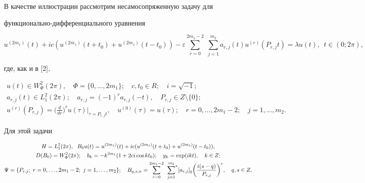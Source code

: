  


В качестве иллюстрации рассмотрим несамосопряженную задачу для 


функционально-диф\-фе\-ренциального уравнения 


\begin{equation} 


u^{(2m_1)}(t){+}i c(u^{(2m_1)}(t{+}t_0){+}u^{(2m_1)}(t{-}t_0))- 


\varepsilon\sum^{2m_1-2}_{r=0}\;\sum^{m_2}_{j=1}a_{r,j} 


(t)u^{(r)}(P_{r,j}t){=}\lambda u(t),\ \; t\in(0;2\pi), 


\end{equation} 


где, как и в [2], 


\begin{gather*} 


u(t)\in W^2_\Phi(2\pi),\quad \Phi=\{0,\dotsc,2m_1\};\quad 


c,t_0\in R;\quad i=\sqrt{-1}; \\ 


% 


a_{r,j}(t)\in L^2_1(2\pi);\quad 


a_{r,j}=(-1)^r a_{r,j}(-t),\quad P_{r,j}\in Z\setminus\{0\};\\ 


% 


u^{(r)}(P_{r,j})=\bigg(\frac{d}{dr}\bigg)^r u(\tau) 


\bigg|_{\tau=P_{r,j}t},\quad u^{(0)}(\tau)=u(\tau);\quad 


r=0,\dotsc,2m_1-2;\quad j=1,\dotsc,m_2. 


\end{gather*} 


Для этой задачи 


\begin{gather*} 


H=L^2_1(2\pi),\ \; B_0u(t)=u^{(2m_1)}(t)+ 


i c(u^{(2m_1)}(t+t_0)+u^{(2m_1)}(t-t_0)), \\ 


% 


D(B_0)=W^2_\Phi(2\pi);\quad 


b_k=-k^{2m_1}(1+2c i\cos k t_0);\quad 


y_k=\exp(i k t),\quad k\in Z;\\ 


% 


\Psi=\{P_{r,j};\ r=0,\dotsc,2m_1-2;\ j=1,\dotsc,m_2\};\quad 


B_{q,s,\alpha}=\sum^{2m_1-2}_{r=0}\; 


\sideset{}{^*}\sum^{m_2}_{j=1}[a_{r,j}]_q 


\bigg(\frac{i(s-q)}{P_{r,j}}\bigg)^r,\quad q,s\in Z, 


\end{gather*} 


